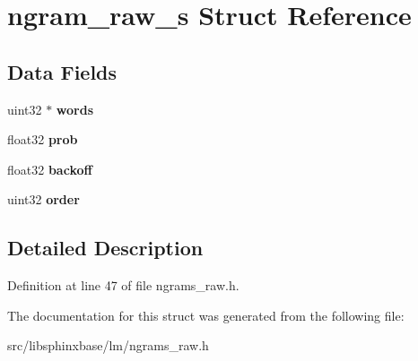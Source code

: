 \section{ngram\+\_\+raw\+\_\+s Struct Reference}
\label{structngram__raw__s}
\subsection*{Data Fields}
\begin{DoxyCompactItemize}
\item 
\mbox{\label{structngram__raw__s_a6d359802e98a78c90e1a1d823db5f8d7}} 
uint32 $\ast$ {\bfseries words}
\item 
\mbox{\label{structngram__raw__s_aaf6462a153d3c4a99d15c61a786bddc2}} 
float32 {\bfseries prob}
\item 
\mbox{\label{structngram__raw__s_a6d7c89d1d644fbd7c710d30a137f5b38}} 
float32 {\bfseries backoff}
\item 
\mbox{\label{structngram__raw__s_ac410c26b5c6f9f7b4514da20eacb2a0b}} 
uint32 {\bfseries order}
\end{DoxyCompactItemize}


\subsection{Detailed Description}


Definition at line 47 of file ngrams\+\_\+raw.\+h.



The documentation for this struct was generated from the following file\+:\begin{DoxyCompactItemize}
\item 
src/libsphinxbase/lm/ngrams\+\_\+raw.\+h\end{DoxyCompactItemize}
